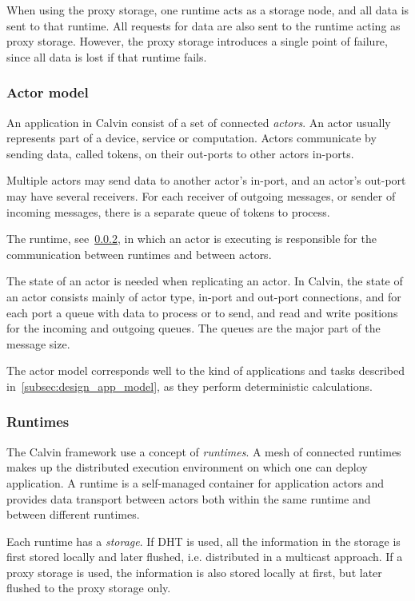 \documentclass{cslthse-msc}
\begin{document}
When using the proxy storage, one runtime acts as a storage node, and all data is sent to that runtime. All requests for data are also sent to the runtime acting as proxy storage. However, the proxy storage introduces a single point of failure, since all data is lost if that runtime fails. %

\subsubsection{Actor model} \label{sec:calvin_actor}
An application in Calvin consist of a set of connected \emph{actors}. An actor usually represents part of a device, service or computation. Actors communicate by sending data, called tokens, on their out-ports to other actors in-ports. 

Multiple actors may send data to another actor's in-port, and an actor's out-port may have several receivers. For each receiver of outgoing messages, or sender of incoming messages, there is a separate queue of tokens to process.

The runtime, see~\cref{sec:calvin_runtime}, in which an actor is executing is responsible for the communication between runtimes and between actors.

The state of an actor is needed when replicating an actor. In Calvin, the state of an actor consists mainly of actor type, in-port and out-port connections, and for each port a queue with data to process or to send, and read and write positions for the incoming and outgoing queues. The queues are the major part of the message size.

The actor model corresponds well to the kind of applications and tasks described in~\cref{subsec:design_app_model}, as they perform deterministic calculations.

\subsubsection{Runtimes} \label{sec:calvin_runtime}
The Calvin framework use a concept of \emph{runtimes}. A mesh of connected runtimes makes up the distributed execution environment on which one can deploy application. A runtime is a self-managed container for application actors and provides data transport between actors both within the same runtime and between different runtimes.

Each runtime has a \emph{storage}. If DHT is used, all the information in the storage is first stored locally and later flushed, i.e. distributed in a multicast approach. If a proxy storage is used, the information is also stored locally at first, but later flushed to the proxy storage only.
\end{document}
